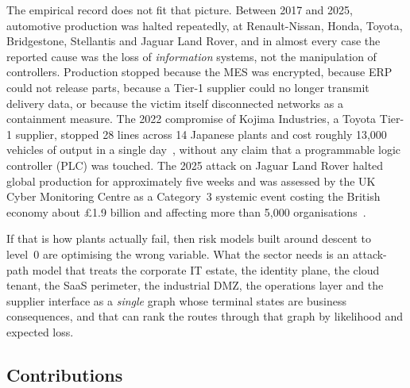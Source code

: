 The empirical record does not fit that picture. Between 2017 and 2025,
automotive production was halted repeatedly, at Renault-Nissan, Honda, Toyota,
Bridgestone, Stellantis and Jaguar Land Rover, and in almost every case the reported cause was the loss of \emph{information} systems, not the
manipulation of controllers. Production stopped because the MES was encrypted,
because ERP could not release parts, because a Tier-1 supplier could no longer
transmit delivery data, or because the victim itself disconnected networks as a
containment measure. The 2022 compromise of Kojima Industries, a Toyota Tier-1
supplier, stopped 28 lines across 14 Japanese plants and cost roughly 13,000
vehicles of output in a single day~\cite{inc04toyota,inc04infosec}, without any
claim that a programmable logic controller (PLC) was touched. The 2025 attack
on Jaguar Land Rover halted global production for approximately five weeks and
was assessed by the UK Cyber Monitoring Centre as a Category~3 systemic event
costing the British economy about \pounds1.9 billion and affecting more than
5,000 organisations~\cite{inc18cmc,inc18cw}.

If that is how plants actually fail, then risk models built around descent to
level~0 are optimising the wrong variable. What the sector needs is an
attack-path model that treats the corporate IT estate, the identity plane, the
cloud tenant, the SaaS perimeter, the industrial DMZ, the operations layer and
the supplier interface as a \emph{single} graph whose terminal states are
business consequences, and that can rank the routes through that graph by
likelihood and expected loss.

\subsection{Contributions}

